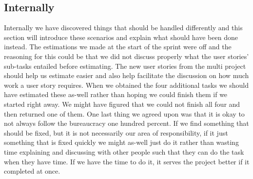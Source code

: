 \subsection{Internally}
Internally we have discovered things that should be handled differently and this section will introduce these scenarios and explain what should have been done instead.
The estimations we made at the start of the sprint were off and the reasoning for this could be that we did not discuss properly what the user stories' sub-tasks entailed before estimating.
The new user stories from the multi project should help us estimate easier and also help facilitate the discussion on how much work a user story requires.
When we obtained the four additional tasks we should have estimated these as-well rather than hoping we could finish them if we started right away.
We might have figured that we could not finish all four and then returned one of them.
One last thing we agreed upon was that it is okay to not always follow the bureaucracy one hundred percent. 
If we find something that should be fixed, but it is not necessarily our area of responsibility, if it just something that is fixed quickly we might as-well just do it rather than wasting time explaining and discussing with other people such that they can do the task when they have time.
If we have the time to do it, it serves the project better if it completed at once.
